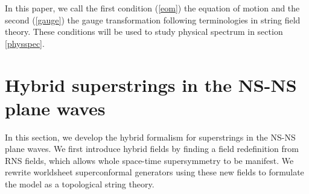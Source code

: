 \documentclass[a4paper,seceq,preprint]{ptptex}
\begin{document}
In this paper, we call the first condition (\ref{eom}) 
the equation of motion and the second (\ref{gauge})
the gauge transformation following terminologies in 
string field theory.
These conditions will be used to study physical spectrum 
in section \ref{physspec}.

\section{Hybrid superstrings in the NS-NS plane waves}\label{hyb}

In this section, we develop the hybrid formalism 
for superstrings in the NS-NS plane waves.
We first introduce hybrid fields by finding
a field redefinition from RNS fields, which allows 
whole space-time supersymmetry to be manifest.
We rewrite worldsheet superconformal generators using
these new fields to formulate the model as a topological
\coordHE{} string theory.
\end{document}
